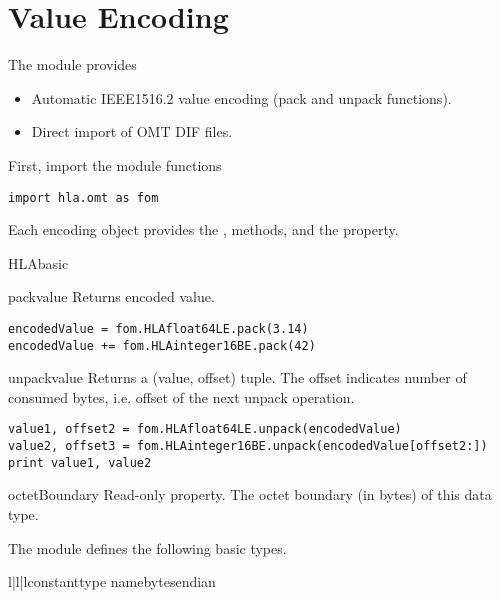 \section{Value Encoding}

The  module provides
\begin{itemize}
\item Automatic IEEE1516.2 value encoding (pack and unpack functions).
\item Direct import of OMT DIF files.
\end{itemize}

First, import the module functions
\begin{verbatim}
import hla.omt as fom
\end{verbatim}

Each encoding object provides the ,  methods, and
the  property.

\begin{classdesc}{HLAbasic}{}
\begin{methoddesc}[HLAbasic]{pack}{value}
Returns encoded value.
\begin{verbatim}
encodedValue = fom.HLAfloat64LE.pack(3.14)
encodedValue += fom.HLAinteger16BE.pack(42)
\end{verbatim}
\end{methoddesc}
\begin{methoddesc}[HLAbasic]{unpack}{value}
Returns a (value, offset) tuple. The offset indicates number of consumed
bytes, i.e. offset of the next unpack operation.
\begin{verbatim}
value1, offset2 = fom.HLAfloat64LE.unpack(encodedValue)
value2, offset3 = fom.HLAinteger16BE.unpack(encodedValue[offset2:])
print value1, value2
\end{verbatim}
\end{methoddesc}
\begin{memberdesc}[int]{octetBoundary}
Read-only property. The octet boundary (in bytes) of this data type.
\end{memberdesc}
\end{classdesc}

The  module defines the following basic types.
\begin{tableiii}{l|l|l}{constant}{type name}{bytes}{endian}
\end{tableiii}

